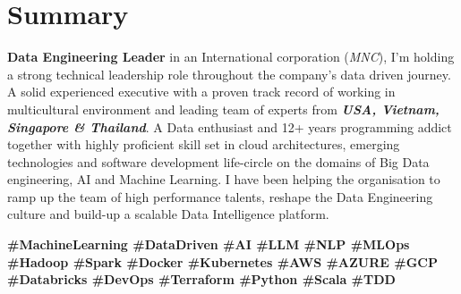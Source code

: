 \section{Summary}\label{sec:summary}
\textbf{Data Engineering Leader} in an International corporation (\emph{MNC}), I’m holding a strong technical leadership role throughout the company’s data driven journey.
A solid experienced executive with a proven track record of working in multicultural environment and leading team of experts from \textbf{\emph{USA, Vietnam, Singapore \& Thailand}}.
A Data enthusiast and 12+ years programming addict together with highly proficient skill set in cloud architectures, emerging technologies and software development life-circle on the domains of Big Data engineering, AI and Machine Learning.
I have been helping the organisation to ramp up the team of high performance talents, reshape the Data Engineering culture and build-up a scalable Data Intelligence platform.
  
  \textbf{\scriptsize{
    \#MachineLearning
    \#DataDriven
    \#AI
    \#LLM
    \#NLP
    \#MLOps
    \#Hadoop
    \#Spark                                                                                                                                                                                                                                                      
    \#Docker
    \#Kubernetes
    \#AWS
    \#AZURE
    \#GCP
    \#Databricks
    \#DevOps
    \#Terraform
    \#Python
    \#Scala
    \#TDD
  }}

